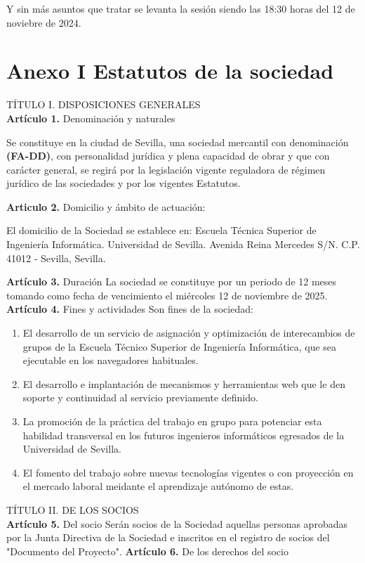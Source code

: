 Y sin más asuntos que tratar se levanta la sesión siendo las 18:30 horas del 12 de noviebre de 2024.

\clearpage
\section{Anexo I Estatutos de la sociedad}

TÍTULO I. DISPOSICIONES GENERALES\\
\textbf{Artículo 1.} Denominación y naturales

Se constituye en la ciudad de Sevilla, una sociedad mercantil con denominación \textbf{(FA-DD)}, con personalidad jurídica y plena capacidad de obrar y que con carácter general, se regirá por la legislación vigente reguladora de régimen jurídico de las sociedades y por los vigentes Estatutos.

\textbf{Articulo 2.} Domicilio y ámbito de actuación:

El domicilio de la Sociedad se establece en: 
Escuela Técnica Superior de Ingeniería Informática. Universidad de Sevilla. Avenida Reina Mercedes S/N. C.P. 41012 - Sevilla, Sevilla.

\textbf{Artículo 3.} Duración
La sociedad se constituye por un periodo de 12 meses tomando como fecha de vencimiento el miércoles 12 de noviembre de 2025.
\textbf{Artículo 4.} Fines y actividades
Son fines de la sociedad:
\begin{enumerate}
    \item El desarrollo de un servicio de asignación y optimización de interecambios de grupos de la Escuela Técnico Superior de Ingeniería Informática, que sea ejecutable en los navegadores habituales.
    \item El desarrollo e implantación de mecanismos y herramientas web que le den soporte y continuidad al servicio previamente definido.
    \item La promoción de la práctica del trabajo en grupo para potenciar esta habilidad transversal en los futuros ingenieros informáticos egresados de la Universidad de Sevilla.
    \item El fomento del trabajo sobre nuevas tecnologías vigentes o con proyección en el mercado laboral meidante el aprendizaje autónomo de estas.
\end{enumerate}

TÍTULO II. DE LOS SOCIOS\\

\textbf{Artículo 5.} Del socio
Serán socios de la Sociedad aquellas personas aprobadas por la Junta Directiva de la Sociedad e inscritos en el registro de socios del "Documento del Proyecto".
\textbf{Artículo 6.} De los derechos del socio

